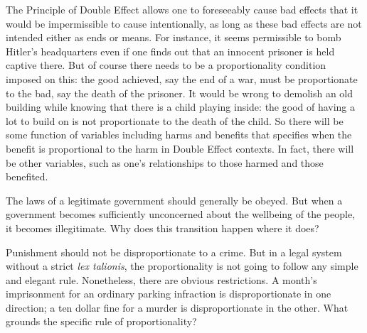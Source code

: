 The Principle of Double Effect allows one to foreseeably cause bad effects that it would
be impermissible to cause intentionally, as long as these bad effects are not intended either as ends or means. For instance, it seems permissible to bomb Hitler's headquarters even
if one finds out that an innocent prisoner is held captive there. But of course there needs to be a proportionality
condition imposed on this: the good achieved, say the end of a war, must be proportionate to the bad, say the death of the prisoner. 
It would be wrong to demolish an old building while knowing that there is a child playing inside: the good of having a lot to build
on is not proportionate to the death of the child. So there will be some function of variables including harms and benefits that
specifies when the benefit is proportional to the harm in Double Effect contexts. In fact, there will be other variables, such as
one's relationships to those harmed and those benefited. 

The laws of a legitimate government should generally be obeyed. But when a government becomes sufficiently unconcerned
about the wellbeing of the people, it becomes illegitimate. Why does this transition happen where it does?

Punishment should not be disproportionate to a crime. But in a legal system without a strict \textit{lex talionis}, the
proportionality is not going to follow any simple and elegant rule. Nonetheless, there are obvious restrictions. 
A month's imprisonment for an ordinary parking infraction is disproportionate in one direction; a ten dollar fine
for a murder is disproportionate in the other. What grounds the specific rule of proportionality?

